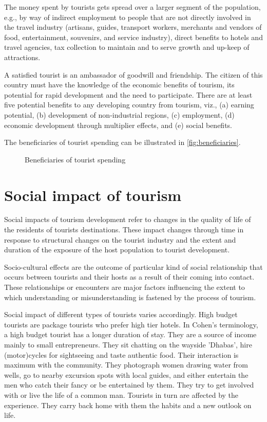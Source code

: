 The money spent by tourists gets spread over a larger segment of the population, e.g., by way of indirect employment to people that are not directly involved in the travel industry (artisans, guides, transport workers, merchants and vendors of food, entertainment, souvenirs, and service industry), direct benefits to hotels and travel agencies, tax collection to maintain and to serve growth and up-keep of attractions.

A satisfied tourist is an ambassador of goodwill and friendship. The citizen of this country must have the knowledge of the economic benefits of tourism, its potential for rapid development and the need to participate. There are at least five potential benefits to any developing country from tourism, viz., (a) earning potential, (b) development of non-industrial regions, (c) employment, (d) economic development through multiplier effects, and (e) social benefits. 

The beneficiaries of tourist spending can be illustrated in \autoref{fig:beneficiaries}.

\begin{figure}[H]
  \centering
  \small
  
  \caption{Beneficiaries of tourist spending}
  \label{fig:beneficiaries} 
\end{figure}


\section{Social impact of tourism} %
\label{sec:simt}

Social impacts of tourism development refer to changes in the quality of life of the residents of tourists destinations. These impact changes through time in response to structural changes on the tourist industry and the extent and duration of the exposure of the host population to tourist development.

Socio-cultural effects are the outcome of particular kind of social relationship that occurs between tourists and their hosts as a result of their coming into contact. These relationships or encounters are major factors influencing the extent to which understanding or misunderstanding is fastened by the process of tourism.

Social impact of different types of tourists varies accordingly. High budget tourists are package tourists who prefer high tier hotels. In Cohen's terminology, a high budget tourist has a longer duration of stay. They are a source of income mainly to small entrepreneurs. They sit chatting on the wayside 'Dhabas', hire (motor)cycles for sightseeing and taste authentic food. Their interaction is maximum with the community. They photograph women drawing water from wells, go to nearby excursion spots with local guides, and either entertain the men who catch their fancy or be entertained by them. They try to get involved with or live the life of a common man. Tourists in turn are affected by the experience. They carry back home with them the habits and a new outlook on life.

